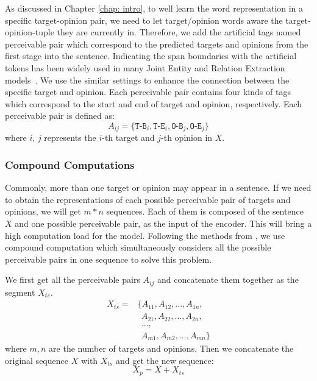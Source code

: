 \documentclass[11pt]{article}
\begin{document}
As discussed in Chapter \ref{chap: intro}, to well learn the word representation in a specific target-opinion pair, we need to let target/opinion words aware the target-opinion-tuple they are currently in. Therefore, we add the artificial tags named perceivable pair which correspond to the predicted targets and opinions from the first stage into the sentence. 
Indicating the span boundaries with the artificial tokens has been widely used in many Joint Entity and Relation Extraction models~\cite{zhang2019ernie,soares2019matching,zhong2020frustratingly}. We use the similar settings to enhance the connection between the specific target and opinion. 
Each perceivable pair contains four kinds of tags which correspond to the start and end of target and opinion, respectively. 
Each perceivable pair is defined as:
\begin{equation}
    A_{ij} = \{ \texttt{T-B}_{i}, \texttt{T-E}_{i}, \texttt{O-B}_{j}, \texttt{O-E}_{j}\}
\end{equation}
where $i$, $j$ represents the $i$-th target and $j$-th opinion in $X$.


\subsubsection{Compound Computations}

Commonly, more than one target or opinion may appear in a sentence. 
If we need to obtain the representations of each possible perceivable pair of targets and opinions, we will get  $m*n$  sequences. Each of them is composed of the sentence $X$ and one possible perceivable pair, as the input of the encoder.
This will bring a high computation load for the model.
Following the methods from \cite{zhong2020frustratingly}, we
use compound computation which simultaneously considers all the possible perceivable pairs in one sequence to solve this problem.

We first get all the perceivable pairs $A_{ij}$  and concatenate them together as the  segment $X_{ts}$.
\begin{equation}
\begin{aligned}
    X_{ts} = &\{ A_{11}, A_{12}, ..., A_{1n} , \\
               & ~~A_{21}, A_{22}, ..., A_{2n} , \\
               & ~~... , \\
               & ~~A_{m1}, A_{m2}, ..., A_{mn}   \}
\end{aligned}
\end{equation}
where $m,n$ are the number of targets and opinions. Then we concatenate the original sequence $X$ with $X_{ts}$ and get the new sequence:
\begin{equation}
    X_p= X + X_{ts} 
\end{equation}
\end{document}
